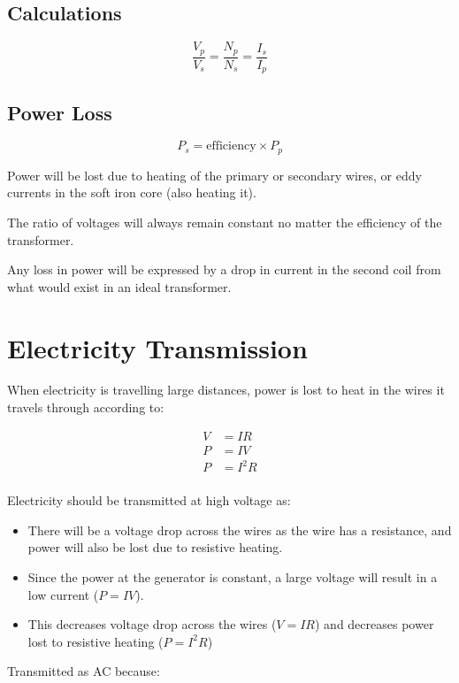 \documentclass[a4paper,11pt]{article}
\begin{document}
\subsection{Calculations}

$$
\frac{V_p}{V_s} = \frac{N_p}{N_s} = \frac{I_s}{I_p}
$$


\subsection{Power Loss}

$$
P_s = \mbox{efficiency} \times P_p
$$

Power will be lost due to heating of the primary or secondary wires, or eddy
currents in the soft iron core (also heating it).

The ratio of voltages will always remain constant no matter the efficiency of
the transformer.

Any loss in power will be expressed by a drop in current in the second coil
from what would exist in an ideal transformer.




\section{Electricity Transmission}

When electricity is travelling large distances, power is lost to heat in the
wires it travels through according to:

$$
\begin{aligned}
V & = IR \\
P & = IV \\
P & = I^2 R \\
\end{aligned}
$$

Electricity should be transmitted at high voltage as:

\begin{itemize}
\item There will be a voltage drop across the wires as the wire has a
	resistance, and power will also be lost due to resistive heating.
\item Since the power at the generator is constant, a large voltage will
	result in a low current ($P = IV$).
\item This decreases voltage drop across the wires ($V = IR$) and decreases
	power lost to resistive heating ($P = I^2R$)
\end{itemize}

Transmitted as AC because:
\end{document}
